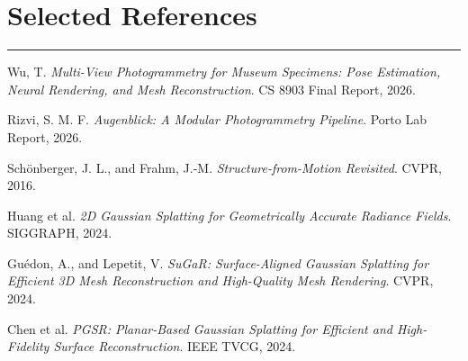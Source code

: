 \documentclass[10pt]{article}
\newcommand{\sectionrule}{\vspace{-4pt}\color{rulegray}\hrule\color{black}\vspace{5pt}}
\begin{document}
\section*{Selected References}
\sectionrule

\begin{enumerate}[label={[\arabic*]},leftmargin=2em]
    \item Wu, T. \textit{Multi-View Photogrammetry for Museum Specimens: Pose Estimation, Neural Rendering, and Mesh Reconstruction}. CS 8903 Final Report, 2026.
    \item Rizvi, S. M. F. \textit{Augenblick: A Modular Photogrammetry Pipeline}. Porto Lab Report, 2026.
    \item Sch\"onberger, J. L., and Frahm, J.-M. \textit{Structure-from-Motion Revisited}. CVPR, 2016.
    \item Huang et al. \textit{2D Gaussian Splatting for Geometrically Accurate Radiance Fields}. SIGGRAPH, 2024.
    \item Gu\'edon, A., and Lepetit, V. \textit{SuGaR: Surface-Aligned Gaussian Splatting for Efficient 3D Mesh Reconstruction and High-Quality Mesh Rendering}. CVPR, 2024.
    \item Chen et al. \textit{PGSR: Planar-Based Gaussian Splatting for Efficient and High-Fidelity Surface Reconstruction}. IEEE TVCG, 2024.
\end{enumerate}
\end{document}
